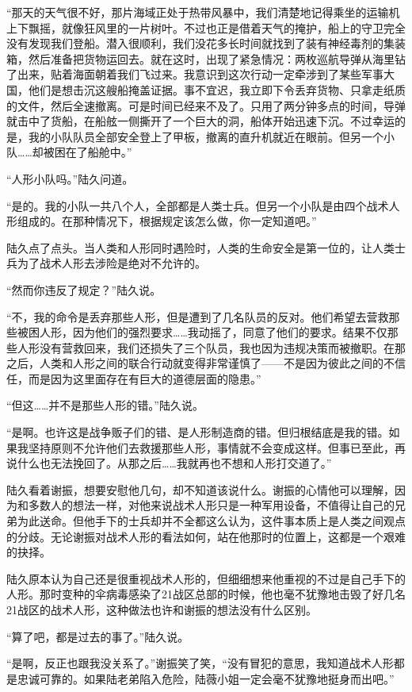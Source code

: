 “那天的天气很不好，那片海域正处于热带风暴中，我们清楚地记得乘坐的运输机上下飘摇，就像狂风里的一片树叶。不过也正是借着天气的掩护，船上的守卫完全没有发现我们登船。潜入很顺利，我们没花多长时间就找到了装有神经毒剂的集装箱，然后准备把货物运回去。就在这时，出现了紧急情况：两枚巡航导弹从海里钻了出来，贴着海面朝着我们飞过来。我意识到这次行动一定牵涉到了某些军事大国，他们是想击沉这艘船掩盖证据。事不宜迟，我立即下令丢弃货物、只拿走纸质的文件，然后全速撤离。可是时间已经来不及了。只用了两分钟多点的时间，导弹就击中了货船，在船舷一侧撕开了一个巨大的洞，船体开始迅速下沉。不过幸运的是，我的小队队员全部安全登上了甲板，撤离的直升机就近在眼前。但另一个小队……却被困在了船舱中。”

“人形小队吗。”陆久问道。

“是的。我的小队一共八个人，全部都是人类士兵。但另一个小队是由四个战术人形组成的。在那种情况下，根据规定该怎么做，你一定知道吧。”

陆久点了点头。当人类和人形同时遇险时，人类的生命安全是第一位的，让人类士兵为了战术人形去涉险是绝对不允许的。

“然而你违反了规定？”陆久说。

“不，我的命令是丢弃那些人形，但是遭到了几名队员的反对。他们希望去营救那些被困人形，因为他们的强烈要求……我动摇了，同意了他们的要求。结果不仅那些人形没有营救回来，我们还损失了三个队员，我也因为违规决策而被撤职。在那之后，人类和人形之间的联合行动就变得非常谨慎了——不是因为彼此之间的不信任，而是因为这里面存在有巨大的道德层面的隐患。”

“但这……并不是那些人形的错。”陆久说。

“是啊。也许这是战争贩子们的错、是人形制造商的错。但归根结底是我的错。如果我坚持原则不允许他们去救援那些人形，事情就不会变成这样。但事已至此，再说什么也无法挽回了。从那之后……我就再也不想和人形打交道了。”

陆久看着谢振，想要安慰他几句，却不知道该说什么。谢振的心情他可以理解，因为和多数人的想法一样，对他来说战术人形只是一种军用设备，不值得让自己的兄弟为此送命。但他手下的士兵却并不全都这么认为，这件事本质上是人类之间观点的分歧。无论谢振对战术人形的看法如何，站在他那时的位置上，这都是一个艰难的抉择。

陆久原本认为自己还是很重视战术人形的，但细细想来他重视的不过是自己手下的人形。那时变种的伞病毒感染了21战区总部的时候，他也毫不犹豫地击毁了好几名21战区的战术人形，这种做法也许和谢振的想法没有什么区别。

“算了吧，都是过去的事了。”陆久说。

“是啊，反正也跟我没关系了。”谢振笑了笑，“没有冒犯的意思，我知道战术人形都是忠诚可靠的。如果陆老弟陷入危险，陆薇小姐一定会毫不犹豫地挺身而出吧。”

